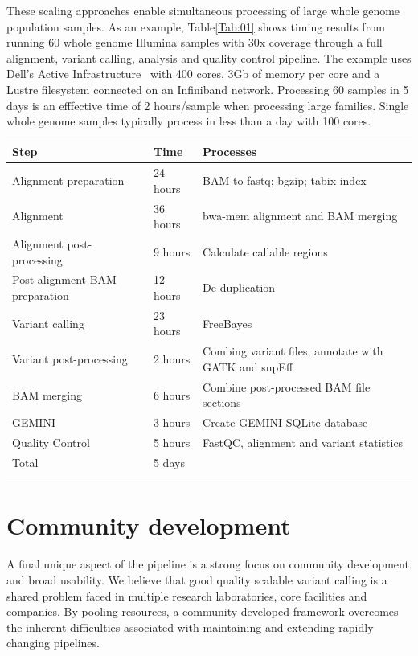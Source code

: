 \documentclass{frontiersSCNS}
\begin{document}
These scaling approaches enable simultaneous processing of large whole genome
population samples. As an example, Table\ref{Tab:01} shows timing results from
running 60 whole genome Illumina samples with 30x coverage through a full
alignment, variant calling, analysis and quality control pipeline. The example
uses Dell's Active Infrastructure~\citep{dell} with 400 cores, 3Gb of memory per
core and a Lustre filesystem connected on an Infiniband network.  Processing 60
samples in 5 days is an efffective time of 2 hours/sample when processing large
families. Single whole genome samples typically process in less than a day with
100 cores.

\begin{table}[!t]
{\begin{tabular}{lll}\toprule
Step & Time & Processes \\
\midrule
Alignment preparation & 24 hours & BAM to fastq; bgzip; tabix index \\
Alignment & 36 hours & bwa-mem alignment and BAM merging \\
Alignment post-processing & 9 hours & Calculate callable regions \\
Post-alignment BAM preparation & 12 hours & De-duplication \\
Variant calling & 23 hours & FreeBayes \\
Variant post-processing & 2 hours & Combing variant files; annotate with GATK and snpEff \\
BAM merging & 6 hours & Combine post-processed BAM file sections \\
GEMINI & 3 hours & Create GEMINI SQLite database \\
Quality Control & 5 hours & FastQC, alignment and variant statistics \\
\midrule
Total & 5 days & \\
\botrule
\end{tabular}}{}
\end{table}

\FloatBarrier

\section*{Community development}

A final unique aspect of the pipeline is a strong focus on community development
and broad usability. We believe that good quality scalable variant calling is a
shared problem faced in multiple research laboratories, core facilities and
companies.  By pooling resources, a community developed framework overcomes the
inherent difficulties associated with maintaining and extending rapidly changing
pipelines.
\end{document}
